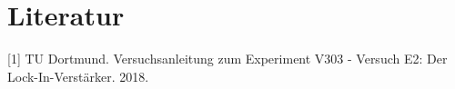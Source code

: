 \section{Literatur}

[1] TU Dortmund. Versuchsanleitung zum Experiment V303 - Versuch E2: Der Lock-In-Verstärker. 2018. 